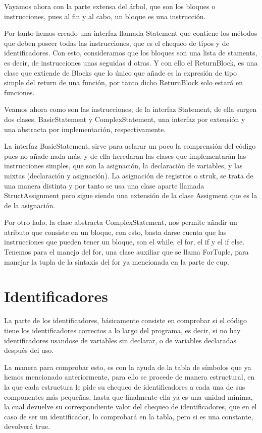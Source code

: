 \documentclass[a4paper, 11pt, twoside, openany, onecolumn, final]{memoir}
\begin{document}
	Vayamos ahora con la parte extensa del árbol, que son los bloques o instrucciones, pues al fin y al cabo, un bloque es una instrucción.
	
	Por tanto hemos creado una interfaz llamada Statement que contiene los métodos que deben poseer todas las instrucciones, que es el chequeo de tipos y de identificadores. 
	Con esto, consideramos que los bloques son una lista de staments, es decir, de instrucciones unas seguidas d otras. Y con ello el ReturnBlock, es una clase que extiende de Blocks que lo único que añade es la expresión de tipo simple del return de una función, por tanto dicho ReturnBlock solo estará en funciones.
	
	Veamos ahora como son las instrucciones, de la interfaz Statement, de ella surgen dos clases, BasicStatement y ComplexStatement, una interfaz por extensión y una abstracta por implementación, respectivamente. 
	
	La interfaz BasicStatement, sirve para aclarar un poco la comprensión del código pues no añade nada más, y de ella heredaran las clases que implementarán las instrucciones simples, que son la asignación, la declaración de variables, y las mixtas (declaración y asignación).
	La asignación de registros o struk, se trata de una manera distinta y por tanto se usa una clase aparte llamada StructAssignment pero sigue siendo una extensión de la clase Assigment que es la de la asignación.
	
	Por otro lado, la clase abstracta ComplexStatement, nos permite añadir un atributo que consiste en un bloque, con esto, basta darse cuenta que las instrucciones que pueden tener un bloque, son el while, el for, el if y el if else. Tenemos para el manejo del for, una clase auxiliar que se llama ForTuple, para manejar la tupla de la sintaxis del for ya mencionada en la parte de cup.
			
	 \section{Identificadores}
	 La parte de los identificadores, básicamente consiste en comprobar si el código tiene los identificadores correctos a lo largo del programa, es decir, si no hay identificadores usandose de variables sin declarar, o de variables declaradas después del uso.
	 
	 La manera para comprobar esto, es con la ayuda de la tabla de símbolos que ya hemos mencionado anteriormente, para ello se procede de manera estructural, en la que cada estructura le pide su chequeo de identificadores a cada una de sus componentes más pequeñas, hasta que finalmente ella ya es una unidad mínima, la cual devuelve su correspondiente valor del chequeo de identificadores, que en el caso de ser un identificador, lo comprobará en la tabla, pero si es una constante, devolverá true.
	 
\end{document}
